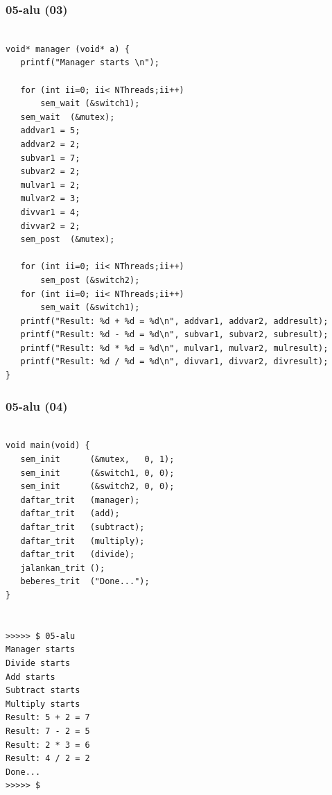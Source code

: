\documentclass[aspectratio=169, xcolor=table, notheorems, hyperref={pdfpagelabels=false}]{beamer}
\begin{document}
\begin{frame}[fragile]
\frametitle{05-alu (03)}
\begin{lstlisting}[basicstyle=\ttfamily\tiny]

void* manager (void* a) {
   printf("Manager starts \n");

   for (int ii=0; ii< NThreads;ii++)
       sem_wait (&switch1);
   sem_wait  (&mutex);
   addvar1 = 5;
   addvar2 = 2;
   subvar1 = 7;
   subvar2 = 2;
   mulvar1 = 2;
   mulvar2 = 3;
   divvar1 = 4;
   divvar2 = 2;
   sem_post  (&mutex);

   for (int ii=0; ii< NThreads;ii++)
       sem_post (&switch2);
   for (int ii=0; ii< NThreads;ii++)
       sem_wait (&switch1);
   printf("Result: %d + %d = %d\n", addvar1, addvar2, addresult);
   printf("Result: %d - %d = %d\n", subvar1, subvar2, subresult);
   printf("Result: %d * %d = %d\n", mulvar1, mulvar2, mulresult);
   printf("Result: %d / %d = %d\n", divvar1, divvar2, divresult);
}

\end{lstlisting}
\end{frame}

\begin{frame}[fragile]
\frametitle{05-alu (04)}
\begin{lstlisting}[basicstyle=\ttfamily\tiny]

void main(void) {
   sem_init      (&mutex,   0, 1);
   sem_init      (&switch1, 0, 0);
   sem_init      (&switch2, 0, 0);
   daftar_trit   (manager);
   daftar_trit   (add);
   daftar_trit   (subtract);
   daftar_trit   (multiply);
   daftar_trit   (divide);
   jalankan_trit ();
   beberes_trit  ("Done...");
}


>>>>> $ 05-alu 
Manager starts 
Divide starts 
Add starts 
Subtract starts 
Multiply starts 
Result: 5 + 2 = 7
Result: 7 - 2 = 5
Result: 2 * 3 = 6
Result: 4 / 2 = 2
Done...
>>>>> $ 

\end{lstlisting}
\end{frame}
\end{document}
